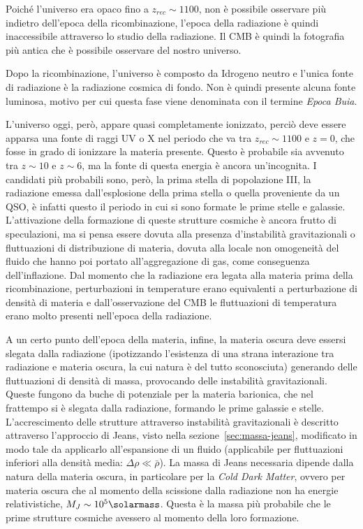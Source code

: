 Poiché l'universo era opaco fino a $z_{rec} \sim 1100$, non è possibile osservare più indietro dell'epoca della ricombinazione, l'epoca della radiazione è quindi inaccessibile attraverso lo studio della radiazione. Il CMB è quindi la fotografia più antica che è possibile osservare del nostro universo.

Dopo la ricombinazione, l'universo è composto da Idrogeno neutro e l'unica fonte di radiazione è la radiazione cosmica di fondo. Non è quindi presente alcuna fonte luminosa, motivo per cui questa fase viene denominata con il termine \textit{Epoca Buia}.

L'universo oggi, però, appare quasi completamente ionizzato, perciò deve essere apparsa una fonte di raggi UV o X nel periodo che va tra $z_{rec} \sim 1100$ e $z = 0$, che fosse in grado di ionizzare la materia presente. Questo è probabile sia avvenuto tra $z \sim 10$ e $z \sim 6$, ma la fonte di questa energia è ancora un'incognita. I candidati più probabili sono, però, la prima stella di popolazione III, la radiazione emessa dall'esplosione della prima stella o quella proveniente da un QSO, è infatti questo il periodo in cui si sono formate le prime stelle e galassie. L'attivazione della formazione di queste strutture cosmiche è ancora frutto di speculazioni, ma si pensa essere dovuta alla presenza d'instabilità gravitazionali o fluttuazioni di distribuzione di materia, dovuta alla locale non omogeneità del fluido che hanno poi portato all'aggregazione di gas, come conseguenza dell'inflazione. Dal momento che la radiazione era legata alla materia prima della ricombinazione, perturbazioni in temperature erano equivalenti a perturbazione di densità di materia e dall'osservazione del CMB le fluttuazioni di temperatura erano molto presenti nell'epoca della radiazione.

A un certo punto dell'epoca della materia, infine, la materia oscura deve essersi slegata dalla radiazione (ipotizzando l'esistenza di una strana interazione tra radiazione e materia oscura, la cui natura è del tutto sconosciuta) generando delle fluttuazioni di densità di massa, provocando delle instabilità gravitazionali. Queste fungono da buche di potenziale per la materia barionica, che nel frattempo si è slegata dalla radiazione, formando le prime galassie e stelle. L'accrescimento delle strutture attraverso instabilità gravitazionali è descritto attraverso l'approccio di Jeans, visto nella sezione~\ref{sec:massa-jeans}, modificato in modo tale da applicarlo all'espansione di un fluido (applicabile per fluttuazioni inferiori alla densità media: $\Delta \rho \ll \bar{\rho}$). La massa di Jeans necessaria dipende dalla natura della materia oscura, in particolare per la \textit{Cold Dark Matter}, ovvero per materia oscura che al momento della scissione dalla radiazione non ha energie relativistiche, $M_J \sim 10^5 \si{\solarmass}$. Questa è la massa più probabile che le prime strutture cosmiche avessero al momento della loro formazione.

